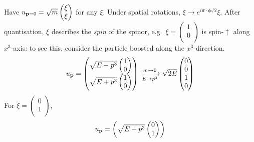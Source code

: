 \begin{example}[$\vb{p} = 0$]
  Have $u_{\vb{p} = 0} = \sqrt{m}
  \begin{pmatrix}
  \xi \\
  \xi \\
  \end{pmatrix}
  $ for any $\xi$. Under spatial rotations, $\xi \to e^{i \boldsymbol\sigma \cdot \boldsymbol \phi / 2} \xi$. After quantisation, $\xi$ describes the \emph{spin} of the spinor, e.g.~$\xi = 
  \begin{pmatrix}
  1 \\
  0 \\
  \end{pmatrix}
  $ is spin-$\uparrow$ along $x^3$-axis: to see this, consider the particle boosted along the $x^3$-direction.
  \begin{equation} \label{eq:16-m1}
    u_{\vb{p}} =
    \begin{pmatrix}
    \sqrt{E - p^3}
    \begin{pmatrix}
    1 \\
    0 \\
    \end{pmatrix}
    \\
    \sqrt{E + p^3}
    \begin{pmatrix}
    1 \\
    0 \\
    \end{pmatrix}
    \\
    \end{pmatrix}
    \xrightarrow[E \to p^3]{m \to 0} \sqrt{2 E} 
    \begin{pmatrix}
    0 \\
    0 \\
    1 \\
    0 \\
    \end{pmatrix}
  \end{equation}
  For $\xi = 
  \begin{pmatrix}
  0 \\
  1 \\
  \end{pmatrix}
  $, 
  \begin{equation}
    u_{\vb{p}} = 
    \begin{pmatrix}
    \sqrt{E + p^3}
    \begin{pmatrix}
    0 \\
    1 \\
    \end{pmatrix}

\end{pmatrix}
\end{equation}
\end{example}
